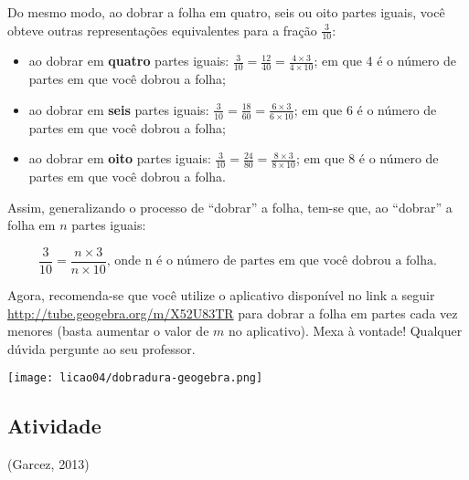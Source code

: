 \begin{refletindo*}
Do mesmo modo, ao dobrar a folha em quatro, seis ou oito partes iguais, você obteve outras representações equivalentes para a fração $\frac{3}{10}$:
\begin{itemize} %
  \item     ao dobrar em     {\bf quatro}     partes iguais:     $\frac{3}{10} = \frac{12}{40} = \frac{4 \times 3}{4 \times 10}$; em que 4 é o número de partes em que você dobrou a folha;
  \item     ao dobrar em     {\bf seis}     partes iguais:     $\frac{3}{10} = \frac{18}{60} = \frac{6 \times 3}{6 \times 10}$; em que 6 é o número de partes em que você dobrou a folha;
  \item     ao dobrar em     {\bf oito}     partes iguais:     $\frac{3}{10} = \frac{24}{80} = \frac{8 \times 3}{8 \times 10}$; em que 8 é o número de partes em que você dobrou a folha.
\end{itemize} %


Assim, generalizando o processo de ``dobrar'' a folha, tem-se que, ao ``dobrar'' a folha em $n$ partes iguais:

$$\dfrac{3}{10}=\dfrac{n \times 3}{n \times 10}\text{, onde n é o número de partes em que você dobrou a folha.}$$

Agora, recomenda-se que você utilize o aplicativo disponível no link a seguir \url{http://tube.geogebra.org/m/X52U83TR} para dobrar a folha em partes cada vez menores (basta aumentar o valor de $m$ no aplicativo). Mexa à vontade! Qualquer dúvida pergunte ao seu professor.
\begin{center}
 \texttt{[image: licao04/dobradura-geogebra.png]}
\end{center}
\end{refletindo*}


\subsection{Atividade}

(Garcez, 2013)

